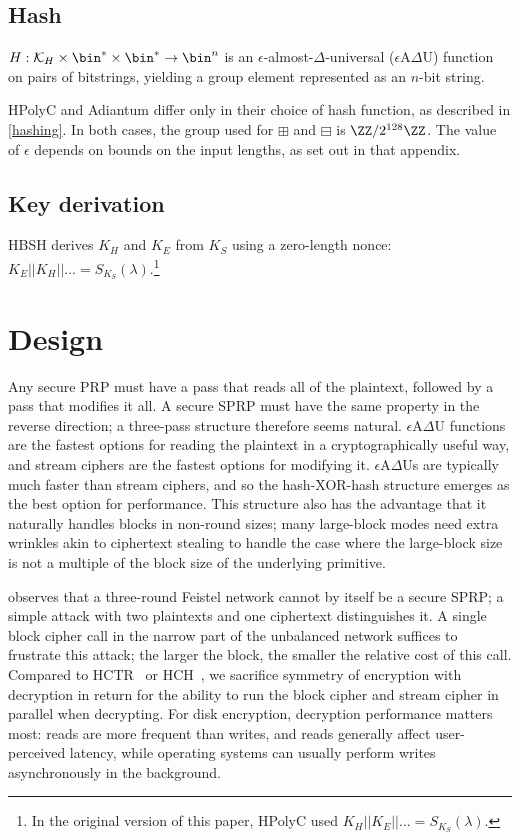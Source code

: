 \documentclass[journal=tosc,preprint,floatrow,submission]{iacrtrans}
\begin{document}
\subsection{Hash}
$H: \mathcal{K}_H \times \bin^{*} \times \bin^{*} \rightarrow \bin^n$
is an $\epsilon$-almost-$\Delta$-universal ($\epsilon$A$\Delta$U) function on pairs
of bitstrings, yielding a group element represented as an $n$-bit string.

HPolyC and Adiantum differ only in their choice of hash function, as described in \autoref{hashing}.
In both cases, the group used for $\boxplus$ and $\boxminus$ is $\ZZ/2^{128}\ZZ$.
The value of $\epsilon$ depends on bounds on the input lengths, as set out in that appendix.

\subsection{Key derivation}\label{keyderivation}
HBSH derives $K_H$ and $K_E$ from $K_S$ using a zero-length nonce:
$K_E || K_H || \ldots = S_{K_S}(\lambda)$.\footnote{In the original
version of this paper, HPolyC used $K_H || K_E || \ldots = S_{K_S}(\lambda)$.}

\section{Design}
Any secure PRP must have a pass that reads all of the plaintext, followed by a pass that modifies
it all. A secure SPRP must have the same property in the reverse direction;
a three-pass structure therefore seems natural.
$\epsilon$A$\Delta$U functions are the fastest options for reading the plaintext in a
cryptographically useful way, and stream ciphers are the fastest options for modifying it.
$\epsilon$A$\Delta$Us
are typically much faster than stream ciphers, and so the hash-XOR-hash structure emerges as
the best option for performance. This structure also has the advantage that it naturally handles
blocks in non-round sizes; many large-block modes need extra wrinkles akin to ciphertext stealing
to handle the case where the large-block size is not
a multiple of the block size of the underlying primitive.

\cite{luby-rackoff} observes that a three-round Feistel network cannot by itself be a secure SPRP;
a simple attack with two plaintexts and one ciphertext distinguishes it. A single block cipher call
in the narrow part of the unbalanced network suffices to frustrate this attack; the
larger the block, the smaller the relative cost of this call.
Compared to HCTR~\cite{hctr} or HCH~\cite{hch}, we sacrifice
symmetry of encryption with decryption in return for
the ability to run the block cipher and stream cipher in parallel when decrypting.
For disk encryption, decryption performance matters most:
reads are more frequent than writes, and reads generally affect user-perceived latency, while
operating systems can usually perform writes asynchronously in the background.
\end{document}
